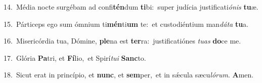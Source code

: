 {\numbfont\textcolor{\numbcolor}{14.}}~Média nocte surgébam ad confi\-\textbf{tén}\-dum \textbf{ti}\-bi:~\star super judícia justificati\-\textit{ó}\-\textit{nis} \textbf{tu}\-æ.\par
{\numbfont\textcolor{\numbcolor}{15.}}~Párticeps ego sum ómnium ti\-\textbf{mén}\-ti\textbf{um} te:~\star et custodiéntium man\-\textit{dá}\-\textit{ta} \textbf{tu}\-a.\par
{\numbfont\textcolor{\numbcolor}{16.}}~Misericórdia tua, Dómine, \textbf{ple}\-na est \textbf{ter}\-ra:~\star justificatiónes \textit{tu}\-\textit{as} \textbf{do}\-ce me.\par
{\numbfont\textcolor{\numbcolor}{17.}}~Glória \textbf{Pa}\-tri, et \textbf{Fí}\-lio,~\star et Spirí\-\textit{tu}\-\textit{i} \textbf{Sanc}\-to.\par
{\numbfont\textcolor{\numbcolor}{18.}}~Sicut erat in princípio, et \textbf{nunc}\-, et \textbf{sem}\-per,~\star et in sǽcula sæcu\-\textit{ló}\-\textit{rum}. \textbf{A}\-men.\par
